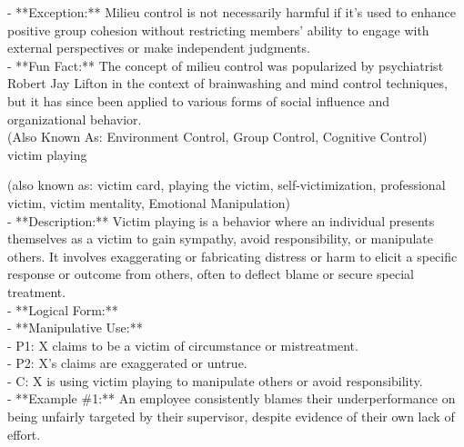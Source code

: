 \documentclass[a4paper,12pt,single,pdftex]{scrartcl}
\begin{document}
    
      - **Exception:** Milieu control is not necessarily harmful if it’s used to enhance positive group cohesion without restricting members' ability to engage with external perspectives or make independent judgments.
    \\

    
      - **Fun Fact:** The concept of milieu control was popularized by psychiatrist Robert Jay Lifton in the context of brainwashing and mind control techniques, but it has since been applied to various forms of social influence and organizational behavior.
    \\

  
    
      (Also Known As: Environment Control, Group Control, Cognitive Control)
    \\

  

 victim playing
    
      (also known as: victim card, playing the victim, self-victimization, professional victim, victim mentality, Emotional Manipulation)
    \\

  
    
      - **Description:** Victim playing is a behavior where an individual presents themselves as a victim to gain sympathy, avoid responsibility, or manipulate others. It involves exaggerating or fabricating distress or harm to elicit a specific response or outcome from others, often to deflect blame or secure special treatment.
    \\

    
      - **Logical Form:**
    \\

    
        - **Manipulative Use:**
    \\

    
          - P1: X claims to be a victim of circumstance or mistreatment.
    \\

    
          - P2: X's claims are exaggerated or untrue.
    \\

    
          - C: X is using victim playing to manipulate others or avoid responsibility.
    \\

    
      - **Example \#1:** An employee consistently blames their underperformance on being unfairly targeted by their supervisor, despite evidence of their own lack of effort.
    \\
\end{document}
